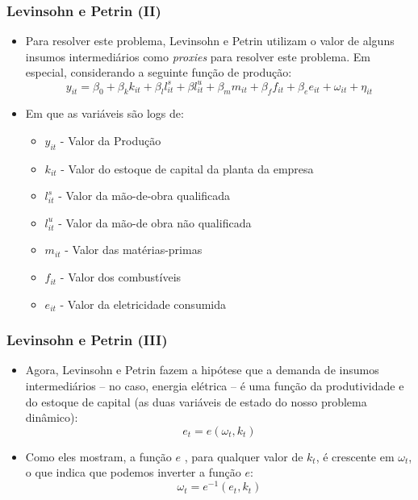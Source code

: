 \documentclass{beamer}
\begin{document}
\begin{frame}\frametitle{Levinsohn e Petrin (II)}

\begin{itemize}
\item Para resolver este problema, Levinsohn e Petrin utilizam o valor de
alguns insumos intermediários como \emph{proxies} para resolver este
problema. Em especial, considerando a seguinte função de produção:
\[
y_{it}=\beta_{0}+\beta_{k}k_{it}+\beta_{l}l_{it}^{s}+\beta l_{it}^{u}+\beta_{m}m_{it}+\beta_{f}f_{it}+\beta_{e}e_{it}+\omega_{it}+\eta_{it}
\]
\item Em que as variáveis são logs de:

\begin{itemize}
\item $y_{it}$ - Valor da Produção
\item $k_{it}$ - Valor do estoque de capital da planta da empresa
\item $l_{it}^{s}$ - Valor da mão-de-obra qualificada
\item $l_{it}^{u}$ - Valor da mão-de obra não qualificada
\item $m_{it}$ - Valor das matérias-primas
\item $f_{it}$ - Valor dos combustíveis
\item $e_{it}$ - Valor da eletricidade consumida
\end{itemize}
\end{itemize}
\end{frame}

\begin{frame}\frametitle{Levinsohn e Petrin (III)}

\begin{itemize}
\item Agora, Levinsohn e Petrin fazem a hipótese que a demanda de insumos
intermediários -- no caso, energia elétrica --
é uma função da produtividade e do estoque de capital (as duas variáveis
de estado do nosso problema dinâmico):
\[
e_{t}=e(\omega_{t},k_{t})
\]
\item Como eles mostram, a função $e$ , para qualquer valor de $k_{t}$,
é crescente em $\omega_{t}$, o que indica que podemos inverter a
função $e$:
\[
\omega_{t}=e^{-1}(e_{t},k_{t})
\]
\end{itemize}
\end{frame}
\end{document}
